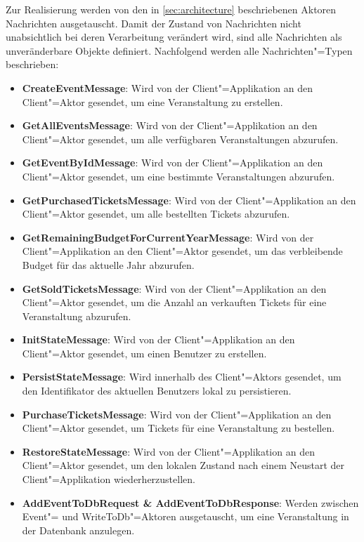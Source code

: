 Zur Realisierung werden von den in \autoref{sec:architecture} beschriebenen Aktoren Nachrichten ausgetauscht.
Damit der Zustand von Nachrichten nicht unabsichtlich bei deren Verarbeitung verändert wird, sind alle Nachrichten als unveränderbare Objekte definiert.
Nachfolgend werden alle Nachrichten"=Typen beschrieben:
\newpage
\begin{itemize}[itemsep=-.5em,leftmargin=*]
    \item \textbf{CreateEventMessage}: Wird von der Client"=Applikation an den Client"=Aktor gesendet, um eine Veranstaltung zu erstellen.
    \item \textbf{GetAllEventsMessage}: Wird von der Client"=Applikation an den Client"=Aktor gesendet, um alle verfügbaren Veranstaltungen abzurufen.
    \item \textbf{GetEventByIdMessage}: Wird von der Client"=Applikation an den Client"=Aktor gesendet, um eine bestimmte Veranstaltungen abzurufen.
    \item \textbf{GetPurchasedTicketsMessage}: Wird von der Client"=Applikation an den Client"=Aktor gesendet, um alle bestellten Tickets abzurufen.
    \item \textbf{GetRemainingBudgetForCurrentYearMessage}: Wird von der Client"=Applikation an den Client"=Aktor gesendet, um das verbleibende Budget für das aktuelle Jahr abzurufen.
    \item \textbf{GetSoldTicketsMessage}: Wird von der Client"=Applikation an den Client"=Aktor gesendet, um die Anzahl an verkauften Tickets für eine Veranstaltung abzurufen.
    \item \textbf{InitStateMessage}: Wird von der Client"=Applikation an den Client"=Aktor gesendet, um einen Benutzer zu erstellen.
    \item \textbf{PersistStateMessage}: Wird innerhalb des Client"=Aktors gesendet, um den Identifikator des aktuellen Benutzers lokal zu persistieren.
    \item \textbf{PurchaseTicketsMessage}: Wird von der Client"=Applikation an den Client"=Aktor gesendet, um Tickets für eine Veranstaltung zu bestellen.
    \item \textbf{RestoreStateMessage}: Wird von der Client"=Applikation an den Client"=Aktor gesendet, um den lokalen Zustand nach einem Neustart der Client"=Applikation wiederherzustellen.
    \item \textbf{AddEventToDbRequest \& AddEventToDbResponse}: Werden zwischen Event"= und WriteToDb"=Aktoren ausgetauscht, um eine Veranstaltung in der Datenbank anzulegen.

\end{itemize}

